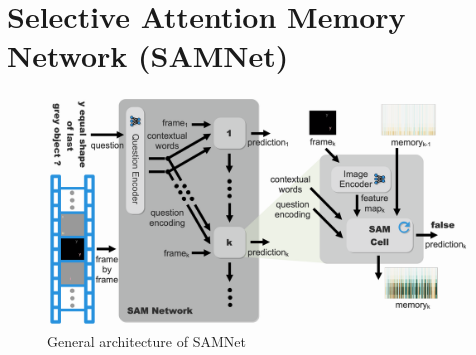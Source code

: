 \section{Selective Attention Memory Network (SAMNet)}



\begin{figure}[hbtp]
	\centering
	\includegraphics[width=\textwidth]{../img/architecture/samnet_architecture4}
	\caption{General architecture of SAMNet}
	\label{fig:samnet}
\end{figure}	

